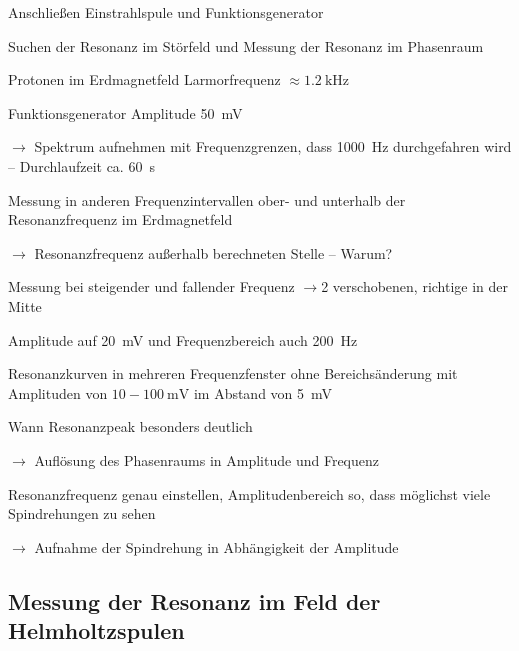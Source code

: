 \documentclass[paper=a4,
	fontsize=10pt,
	DIV=18,
	twocolumn,
	parskip=half
	]{scrartcl}
\numberwithin{equation}{section}    %
\newcommand{\tra}{$\rightarrow$}
\begin{document}
\begin{compactitem}
	\item Anschließen Einstrahlspule und Funktionsgenerator
	\item Suchen der Resonanz im Störfeld und Messung der Resonanz im Phasenraum
	\item Protonen im Erdmagnetfeld Larmorfrequenz $\approx \SI{1.2}{\kilo\hertz}$
	\item Funktionsgenerator Amplitude \SI{50}{\milli\volt}
	\item[\tra] Spektrum aufnehmen mit Frequenzgrenzen, dass \SI{1000}{\hertz} durchgefahren wird \--- Durchlaufzeit ca. \SI{60}{\second}
	\item Messung in anderen Frequenzintervallen ober- und unterhalb der Resonanzfrequenz im Erdmagnetfeld 
	\item[\tra] Resonanzfrequenz außerhalb berechneten Stelle \--- Warum?
	\item Messung bei steigender und fallender Frequenz \tra 2 verschobenen, richtige in der Mitte
	\item Amplitude auf \SI{20}{\milli\volt} und Frequenzbereich auch \SI{200}{\hertz}
	\item Resonanzkurven in mehreren Frequenzfenster ohne Bereichsänderung mit Amplituden von $10-\SI{100}{\milli\volt}$ im Abstand von \SI{5}{\milli\volt}
	\item Wann Resonanzpeak besonders deutlich
	\item[\tra] Auflösung des Phasenraums in Amplitude und Frequenz
	\item Resonanzfrequenz genau einstellen, Amplitudenbereich so, dass möglichst viele Spindrehungen zu sehen
	\item[\tra] Aufnahme der Spindrehung in Abhängigkeit der Amplitude
\end{compactitem}


\subsection{Messung der Resonanz im Feld der Helmholtzspulen}
\label{vorbereitung6}

\begin{compactitem}
	\item 
\end{compactitem}
\end{document}
